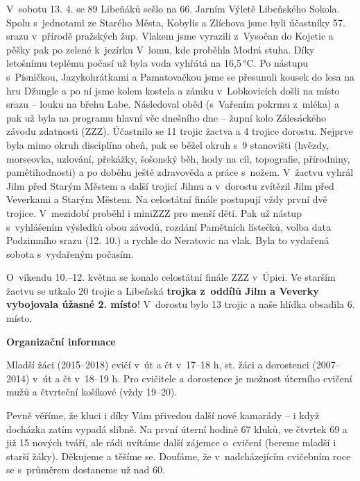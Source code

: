 \documentclass[11pt]{article}
\begin{document}
V~sobotu 13. 4. se 89 Libeňáků sešlo na 66. Jarním Výletě Libeňského Sokola. Spolu s~jednotami ze Starého Města, Kobylis a Zlíchova jsme byli účastníky 57. srazu v~přírodě pražských žup. Vlakem jsme vyrazili z~Vysočan do Kojetic a pěšky pak po zelené k~jezírku V~lomu, kde proběhla Modrá stuha. Díky letošnímu teplému počasí už byla voda vyhřátá na 16,5\,°C. Po nástupu s~Písničkou, Jazykohrátkami a Pamatovačkou jsme se přesunuli kousek do lesa na hru Džungle a po ní jsme kolem kostela a zámku v~Lobkovicích došli na místo srazu – louku na břehu Labe. Následoval oběd (s~Vařením pokrmu z~mléka) a pak už byla na programu hlavní věc dnešního dne – župní kolo Zálesáckého závodu zdatnosti (ZZZ). Účastnilo se 11 trojic žactva a 4 trojice dorostu. Nejprve byla mimo okruh disciplína oheň, pak se běžel okruh s~9 stanovišti (hvězdy, morseovka, uzlování, překážky, šošonský běh, hody na cíl, topografie, přírodniny, pamětihodnosti) a po doběhu ještě zdravověda a práce s~nožem. V~žactvu vyhrál Jilm před Starým Městem a další trojicí Jilmu a v~dorostu zvítězil Jilm před Veverkami a Starým Městem. Na celostátní finále postupují vždy první dvě trojice. V~mezidobí proběhl i miniZZZ pro menší děti. Pak už nástup s~vyhlášením výsledků obou závodů, rozdání Pamětních lístečků, volba data Podzimního srazu (12. 10.) a rychle do Neratovic na vlak. Byla to vydařená sobota s~vydařeným počasím.

O~víkendu 10.–12. května se konalo celostátní finále ZZZ v~Úpici. Ve starším žactvu se utkalo 20 trojic a Libeňská \textbf{trojka z~oddílů Jilm a Veverky vybojovala úžasné 2. místo}! V~dorostu bylo 13 trojic a naše hlídka obsadila 6. místo.

\vspace*{12pt}
\begin{center}
  \noindent\textbf{Organizační informace}
\end{center}
\vspace*{6pt}
Mladší žáci (2015–2018) cvičí v~út a čt v~17–18 h, st. žáci a dorostenci (2007–2014) v~út a čt v~18–19 h. Pro cvičitele a dorostence je možnost úterního cvičení mužů a čtvrteční košíkové (vždy 19–20).

Pevně věříme, že kluci i díky Vám přivedou další nové kamarády – i když docházka zatím vypadá slibně. Na první úterní hodině 67 kluků, ve čtvrtek 69 a již 15 nových tváří, ale rádi uvítáme další zájemce o~cvičení (bereme mladší i starší žáky). Děkujeme a těšíme se. Doufáme, že v~nadcházejícím cvičebním roce se s~průměrem dostaneme už nad 60.
\end{document}
